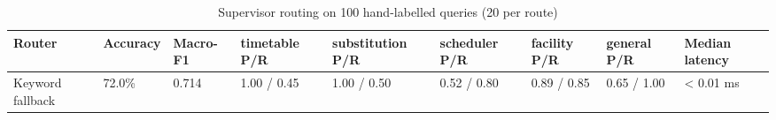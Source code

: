 \begin{table}[t]
\centering
\small
\begin{tabular}{lllllllll}
\toprule
Router & Accuracy & Macro-F1 & timetable P/R & substitution P/R & scheduler P/R & facility P/R & general P/R & Median latency \\
\midrule
Keyword fallback & 72.0\% & 0.714 & 1.00 / 0.45 & 1.00 / 0.50 & 0.52 / 0.80 & 0.89 / 0.85 & 0.65 / 1.00 & < 0.01 ms \\
\bottomrule
\end{tabular}
\caption{Supervisor routing on 100 hand-labelled queries (20 per route)}
\label{tab:t2-routing}
\end{table}
